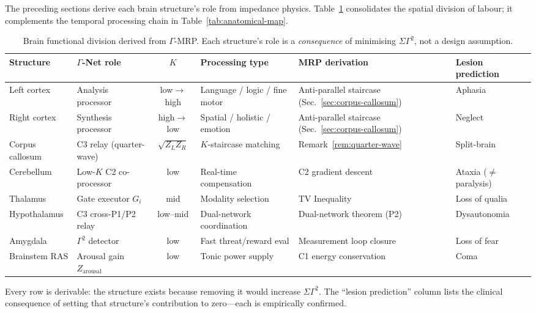 \documentclass[aps,pre,twocolumn,superscriptaddress,floatfix]{revtex4-2}
\begin{document}
\begin{remark}
\label{rem:brain-division}
The preceding sections derive each brain structure's
role from impedance physics.
Table~\ref{tab:brain-division} consolidates the
spatial division of labour; it complements
the temporal processing chain in
Table~\ref{tab:anatomical-map}.
\begin{table}[t]
\centering
\caption{Brain functional division derived from
$\Gamma$-MRP.  Each structure's role is a
\emph{consequence} of minimising $\Sigma\Gamma^2$,
not a design assumption.}
\label{tab:brain-division}
\begin{tabular}{@{}llclll@{}}
\toprule
Structure & $\Gamma$-Net role & $K$ &
  Processing type & MRP derivation &
  Lesion prediction \\
\midrule
Left cortex &
  Analysis processor &
  low${\to}$high &
  Language / logic / fine motor &
  Anti-parallel staircase
  (Sec.~\ref{sec:corpus-callosum}) &
  Aphasia \\
Right cortex &
  Synthesis processor &
  high${\to}$low &
  Spatial / holistic / emotion &
  Anti-parallel staircase
  (Sec.~\ref{sec:corpus-callosum}) &
  Neglect \\
Corpus callosum &
  C3 relay (quarter-wave) &
  $\sqrt{Z_L Z_R}$ &
  $K$-staircase matching &
  Remark~\ref{rem:quarter-wave} &
  Split-brain \\
Cerebellum &
  Low-$K$ C2 co-processor &
  low &
  Real-time compensation &
  C2 gradient descent &
  Ataxia ($\neq$ paralysis) \\
Thalamus &
  Gate executor $G_i$ &
  mid &
  Modality selection &
  TV Inequality &
  Loss of qualia \\
Hypothalamus &
  C3 cross-P1/P2 relay &
  low--mid &
  Dual-network coordination &
  Dual-network theorem (P2) &
  Dysautonomia \\
Amygdala &
  $\Gamma^2$ detector &
  low &
  Fast threat/reward eval &
  Measurement loop closure &
  Loss of fear \\
Brainstem RAS &
  Arousal gain $Z_{\text{arousal}}$ &
  low &
  Tonic power supply &
  C1 energy conservation &
  Coma \\
\bottomrule
\end{tabular}
\end{table}
Every row is derivable: the structure exists because
removing it would increase $\Sigma\Gamma^2$.
The ``lesion prediction'' column lists the
clinical consequence of setting that structure's
contribution to zero---each is empirically
confirmed.
\end{remark}
\end{document}
